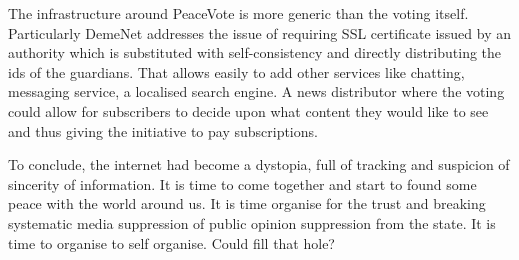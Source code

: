 \documentclass[12pt,a4paper]{article}
\renewcommand{\texttt}[1]{\jlinl{#1}}
\begin{document}
The infrastructure around PeaceVote is more generic than the voting itself. Particularly DemeNet addresses the issue of requiring SSL certificate issued by an authority which is substituted with self-consistency and directly distributing the ids of the guardians. That allows easily to add other services like chatting, messaging service, a localised search engine. A news distributor where the voting could allow for subscribers to decide upon what content they would like to see and thus giving the initiative to pay subscriptions.\par
To conclude, the internet had become a dystopia, full of tracking and suspicion of sincerity of information. It is time to come together and start to found some peace with the world around us. It is time organise for the trust and breaking systematic media suppression of public opinion suppression from the state. It is time to organise to self organise. Could \texttt{PeaceVote} fill that hole?\par


\end{document}
